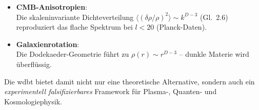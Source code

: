 \begin{itemize}  
    \item \textbf{CMB-Anisotropien}:\\Die skaleninvariante Dichteverteilung $\langle (\delta\rho/\rho)^2 \rangle \sim k^{D-3}$ (Gl.~2.6) reproduziert das flache Spektrum bei $l < 20$ (Planck-Daten).  
    \item \textbf{Galaxienrotation}:\\Die Dodekaeder-Geometrie führt zu $\rho(r) \sim r^{D-3}$ – dunkle Materie wird überflüssig.  
\end{itemize}  

\noindent  
Die \gls{wdbt} bietet damit nicht nur eine theoretische Alternative, sondern auch ein \textit{experimentell falsifizierbares} Framework für Plasma-, Quanten- und Kosmologiephysik.
